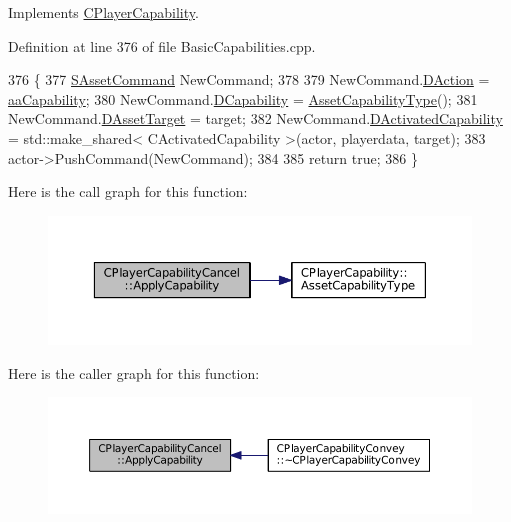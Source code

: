 Implements \hyperlink{classCPlayerCapability_a2ca6fd7fbd9c0178f1cf1d049c63825f}{C\+Player\+Capability}.



Definition at line 376 of file Basic\+Capabilities.\+cpp.


\begin{DoxyCode}
376                                                                                                            
                                                          \{
377     \hyperlink{structSAssetCommand}{SAssetCommand} NewCommand;
378     
379     NewCommand.\hyperlink{structSAssetCommand_a8edd3b3d59a76d5514ba403bc8076a75}{DAction} = \hyperlink{GameDataTypes_8h_ab47668e651a3032cfb9c40ea2d60d670acf9fb164e8abd71c71f4a8c7fda360d4}{aaCapability};
380     NewCommand.\hyperlink{structSAssetCommand_a734ea7c6847457b437360f333f570ff9}{DCapability} = \hyperlink{classCPlayerCapability_a433bb196cd6ab6a932f1cac102b3aa98}{AssetCapabilityType}();
381     NewCommand.\hyperlink{structSAssetCommand_a3d9b43f6e59c386c48c41a65448a0c39}{DAssetTarget} = target;
382     NewCommand.\hyperlink{structSAssetCommand_ad8beda19520811cc70fe1eab16c774dd}{DActivatedCapability} = std::make\_shared< CActivatedCapability >(actor, 
      playerdata, target);
383     actor->PushCommand(NewCommand);
384 
385     \textcolor{keywordflow}{return} \textcolor{keyword}{true};
386 \}
\end{DoxyCode}
Here is the call graph for this function\+:
\nopagebreak
\begin{figure}[H]
\begin{center}
\leavevmode
\includegraphics[width=350pt]{classCPlayerCapabilityCancel_a8f738ac375bf5d1e7f8b768bce16b946_cgraph}
\end{center}
\end{figure}
Here is the caller graph for this function\+:
\nopagebreak
\begin{figure}[H]
\begin{center}
\leavevmode
\includegraphics[width=350pt]{classCPlayerCapabilityCancel_a8f738ac375bf5d1e7f8b768bce16b946_icgraph}
\end{center}
\end{figure}
\hypertarget{classCPlayerCapabilityCancel_a0221e4e768c998cb46f1dbc757647ec1}{}\label{classCPlayerCapabilityCancel_a0221e4e768c998cb46f1dbc757647ec1} 
